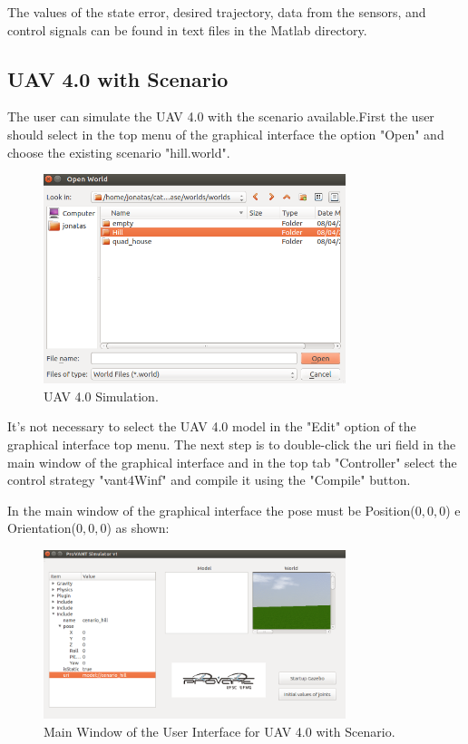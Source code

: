 	The values of the state error, desired trajectory, data from the sensors, and control signals can be found in text files in the Matlab directory.
	
	\subsection{UAV 4.0 with Scenario}
	
	The user can simulate the UAV 4.0 with the scenario available.First the user should select in the top menu of the graphical interface the option "Open" and choose the existing scenario "hill.world".
	
	
	
	\begin{figure}[!ht]
		\centering
		\includegraphics[width=250pt]{figuras/cenarioworld.png}
		\caption{UAV 4.0 Simulation.}
		\label{cenarioworld}
	\end{figure}

	It's not necessary to select the UAV 4.0 model in the "Edit" option of the graphical interface top menu. The next step is to double-click the uri field in the main window of the graphical interface and in the top tab "Controller" select the control strategy "vant4Winf" and compile it using the "Compile" button.
	
	In the main window of the graphical interface the pose must be Position($0,0,0$) e Orientation($0,0,0$) as shown:
	
	
	\begin{figure}[!ht]
		\centering
		\includegraphics[width=250pt]{figuras/cenariogui.png}
		\caption{Main Window of the User Interface for UAV 4.0 with Scenario.}
		\label{cenariogui}
	\end{figure}

